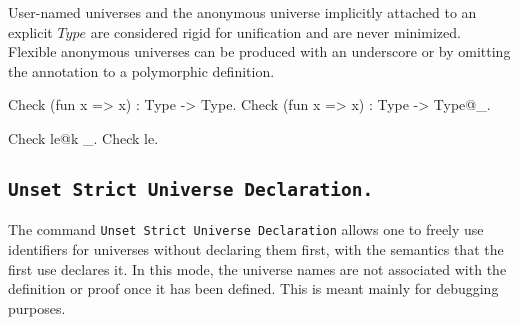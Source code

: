 User-named universes and the anonymous universe implicitly attached to
an explicit $Type$ are considered rigid for unification and are never
minimized. Flexible anonymous universes can be produced with an
underscore or by omitting the annotation to a polymorphic definition.

\begin{coq_example}
  Check (fun x => x) : Type -> Type.
  Check (fun x => x) : Type -> Type@{_}.

  Check le@{k _}.
  Check le.
\end{coq_example}

\subsection{\tt Unset Strict Universe Declaration.
  \label{StrictUniverseDeclaration}}

The command \texttt{Unset Strict Universe Declaration} allows one to
freely use identifiers for universes without declaring them first, with
the semantics that the first use declares it. In this mode, the universe
names are not associated with the definition or proof once it has been
defined. This is meant mainly for debugging purposes.


